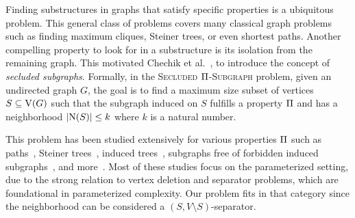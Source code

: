 Finding substructures in graphs that satisfy specific properties is a ubiquitous problem. This general class of problems covers many classical graph problems such as finding maximum cliques, Steiner trees, or even shortest paths. Another compelling property to look for in a substructure is its isolation from the remaining graph. This motivated Chechik et al.~\cite{chechik2017secluded}, to introduce the concept of \emph{secluded subgraphs}. 
Formally, in the \textsc{Secluded $\operatorname{\Pi}$-Subgraph} problem, given an undirected graph $G$, the goal is to find a maximum size subset of vertices $S \subseteq \operatorname{V}({G})$ such that the subgraph induced on $S$ fulfills a property $\operatorname{\Pi}$ and has a neighborhood $\abs{\nei{S}} \le k$ where $k$ is a natural number.

This problem has been studied extensively for various properties $\operatorname{\Pi}$ such as paths~\cite{van2020parameterized,luckow2020computational,fomin2017parameterized,chechik2017secluded}, Steiner trees~\cite{chechik2017secluded,fomin2017parameterized}, induced trees~\cite{donkers2023finding,golovach2020finding}, subgraphs free of forbidden induced subgraphs~\cite{golovach2020finding,jansen2023single}, and more~\cite{bevern207finding}.
Most of these studies focus on the parameterized setting, due to the strong relation to vertex deletion and separator problems, which are foundational in parameterized complexity. Our problem fits in that category since the neighborhood can be considered a $(S,V \setminus S)$-separator. 




